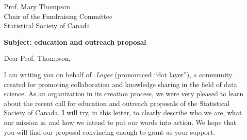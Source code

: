 \documentclass[11pt, a4paper]{letter} %
\begin{document}

\begin{letter}{
	Prof. Mary Thompson\\
	Chair of the Fundraising Committee\\
	Statistical Society of Canada
	
	\bigskip
	\textbf{Subject: education and outreach proposal}%
}



\opening{Dear Prof. Thompson,}

%

I am writing you on behalf of \textit{.Layer} (pronounced ``dot layer''), a community created for promoting collaboration and knowledge sharing in the field of data science. As an organization in its creation process, we were very pleased to learn about the recent call for education and outreach proposals of the Statistical Society of Canada. I will try, in this letter, to clearly describe who we are, what our mission is, and how we intend to put our words into action. We hope that you will find our proposal convincing enough to grant us your support.

%
%   



\end{letter}
\end{document}
